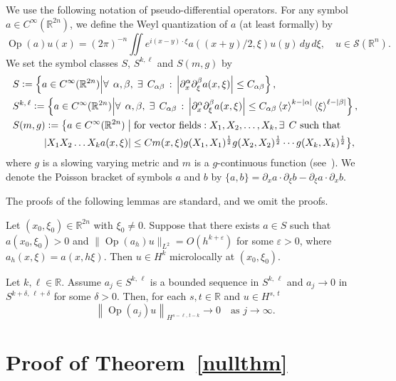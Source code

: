 \documentclass[AHL,Unicode,longabstracts,published]{cedram}
\renewcommand*\a{\alpha}
\renewcommand*\b{\beta}
\renewcommand*\d{\delta}
\newcommand*\e{\varepsilon}
\newcommand*\x{\xi}
\DeclareMathOperator{\Op}{Op}
\newcommand*\re{\mathbb{R}}
\newcommand{\clS}{\mathcal{S}}
\newcommand*\pa{\partial}
\newcommand*\coloneqq{\mathrel{\mathop:}=}
\newcommand{\jap}[1]{\left\langle #1 \right\rangle}
\newcommand{\bigset}[2]{\bigl\{#1\bigm|#2\bigr\}}
\let\oldexists\exists
\renewcommand*{\exists}{\mathrel{\oldexists}}
\let\oldforall\forall
\renewcommand*{\forall}{\mathrel{\oldforall}}
\begin{document}
We use the following notation of pseudo-differential operators. For any symbol $a\in C^{\infty}(\re^{2n})$, we define the Weyl quantization of $a$ (at least formally) by
\[
\Op(a) u(x) =(2\pi)^{-n} \iint e^{i(x-y)\cdot\x} a((x+y)/2,\x) u(y) \,dy\,d\x, \quad u\in\clS(\re^n).
\]
We set the symbol classes $S$, $S^{k,\ell}$ and $S(m,g)$ by
\begin{align*}
&S \coloneqq \left\{a\in C^{\infty}(\re^{2n})\middle|\forall\,\a, \b,\;\exists\, C_{\a\b} \, :\, \left|\pa_x^{\a}\pa_{\x}^{\b}a(x,\x)\right| \leq C_{\a\b}\right\},\\
&S^{k,\,\ell} \coloneqq \left\{a\in C^{\infty}(\re^{2n})\middle|\forall\,\a, \b,\;\exists\, C_{\a\b} \,:\, \left|\pa_x^{\a}\pa_{\x}^{\b}a(x,\x)\right| \leq C_{\a\b}\jap{x}^{k-|\a|}\jap{\x}^{\ell-|\b|}\right\},\\
& S(m,g) \coloneqq \bigset{a\in C^{\infty}(\re^{2n})}{\text{for vector fields}: X_1,X_2,\dots,X_k,
\exists\, C \text{ such that}\\
& \qquad\quad \left|X_1X_2\dots X_ka(x,\x)\right| \leq Cm(x,\x)g(X_1,X_1)^{\frac{1}{2}}g(X_2,X_2)^{\frac{1}{2}}\cdots g(X_k,X_k)^{\frac{1}{2}}},
\end{align*}
where $g$ is a slowing varying metric and $m$ is a $g$-continuous function (see~\cite[Section~18.4]{Ho}). We denote the Poisson bracket of symbols $a$ and $b$ by $\{a,b\}=\pa_x a\cdot\pa_\x b -\pa_\x a\cdot\pa_x b$.


The proofs of the following lemmas are standard, and we omit the proofs.

\begin{lemm}\label{propwf}
Let $(x_0, \x_0)\in \re^{2n}$ with $\x_0 \neq 0$. Suppose that there exists $a\in S$ such that $a(x_0, \x_0)>0$ and $\| \Op(a_h)u \|_{L^2} = O(h^{k+\e})$ for some $\e>0$, where $a_h(x,\x)=a(x,h\x)$. Then $u\in H^k$ microlocally at $(x_0,\x_0)$.
\end{lemm}


\begin{lemm}\label{convergence}
Let $k,\ell\in \re$. Assume $a_j\in S^{k,\,\ell}$ is a bounded sequence in $ S^{k,\,\ell}$ and $a_j\to 0$ in $S^{k+\d,\,\ell+\d}$ for some $\d>0$. Then, for each $s, t\in \re$ and $u\in H^{s,\,t}$
\[
\left\|\Op(a_j)u\right\|_{H^{s-\ell,\,t-k}}\to 0\quad\text{as } j\to \infty.
\]
\end{lemm}



\section{Proof of Theorem~\ref{nullthm}}\label{section-proof}
\end{document}
